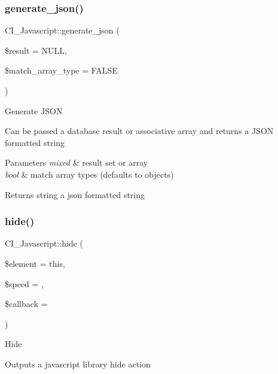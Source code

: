 \subsubsection{\texorpdfstring{generate\+\_\+json()}{generate\_json()}}
{\footnotesize\ttfamily C\+I\+\_\+\+Javascript\+::generate\+\_\+json (\begin{DoxyParamCaption}\item[{}]{\$result = {\ttfamily NULL},  }\item[{}]{\$match\+\_\+array\+\_\+type = {\ttfamily FALSE} }\end{DoxyParamCaption})}

Generate J\+S\+ON

Can be passed a database result or associative array and returns a J\+S\+ON formatted string


\begin{DoxyParams}{Parameters}
{\em mixed} & result set or array \\
\hline
{\em bool} & match array types (defaults to objects) \\
\hline
\end{DoxyParams}
\begin{DoxyReturn}{Returns}
string a json formatted string 
\end{DoxyReturn}
\mbox{\label{class_c_i___javascript_a85e5b16273718b1b48d68b55cd8c2942}} 
\subsubsection{\texorpdfstring{hide()}{hide()}}
{\footnotesize\ttfamily C\+I\+\_\+\+Javascript\+::hide (\begin{DoxyParamCaption}\item[{}]{\$element = {\ttfamily \textquotesingle{}this\textquotesingle{}},  }\item[{}]{\$speed = {\ttfamily \textquotesingle{}\textquotesingle{}},  }\item[{}]{\$callback = {\ttfamily \textquotesingle{}\textquotesingle{}} }\end{DoxyParamCaption})}

Hide

Outputs a javascript library hide action


